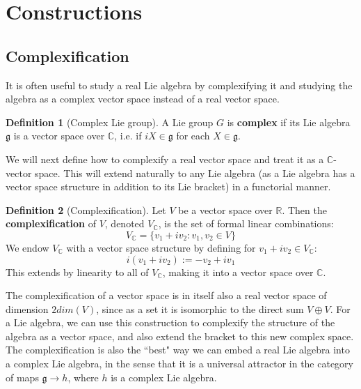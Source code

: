 \documentclass[11pt, oneside]{article}   	%
\theoremstyle{definition}
\newtheorem{definition}{Definition}[section]
\begin{document}
\newpage
\section{Constructions}

\subsection{Complexification}

It is often useful to study a real Lie algebra by complexifying it and studying the algebra as a complex 
vector space instead of a real vector space. 
\begin{definition}[Complex Lie group]
	A Lie group $G$ is \textbf{complex} if its Lie algebra $\mathfrak g$ is a vector space over $\mathbb C$, 
	i.e. if $iX\in\mathfrak g$ for each $X\in\mathfrak g$. 
\end{definition}

We will next define how to complexify a real vector space and treat it as a $\mathbb C$-vector space. This 
will extend naturally to any Lie algebra (as a Lie algebra has a vector space structure in addition to its Lie 
bracket) in a functorial manner. 
\begin{definition}[Complexification]
	Let $V$ be a vector space over $\mathbb R$. Then the \textbf{complexification} of $V$, denoted $V_\mathbb{C}$, is the set of 
	formal linear combinations:
	\begin{equation}
		V_\mathbb{C} = \{v_1 + iv_2 : v_1, v_2\in V\}
	\end{equation}
	We endow $V_\mathbb{C}$ with a vector space structure by defining for $v_1 + iv_2\in V_\mathbb{C}$:
	\begin{equation}
		i(v_1 + iv_2) := -v_2 + iv_1
	\end{equation}
	This extends by linearity to all of $V_\mathbb{C}$, making it into a vector space over $\mathbb C$. 
\end{definition}

The complexification of a vector space is in itself also a real vector space of dimension $2dim(V)$, since as a set it is isomorphic to 
the direct sum $V\oplus V$. For a Lie algebra, we can use this construction to complexify the structure of the algebra as a vector space, 
and also extend the bracket to this new complex space. The complexification is also the ``best" way we can embed a real Lie algebra 
into a complex Lie algebra, in the sense that it is a universal attractor in the category of maps $\mathfrak g\rightarrow h$, where 
$h$ is a complex Lie algebra. 
\end{document}
